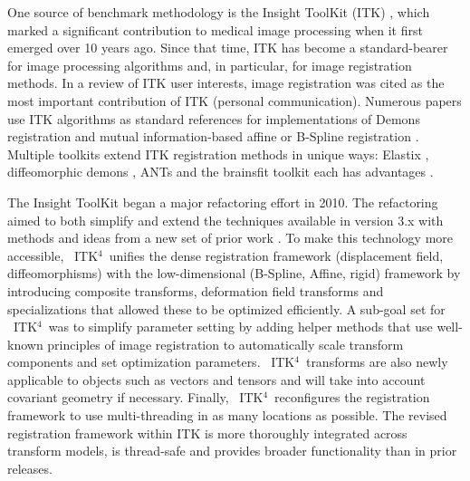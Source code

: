 \documentclass{llncs}
\newcommand{\tk}{~ITK$^{\text{4}}$~}
\begin{document}





One source of benchmark methodology is the Insight ToolKit (ITK)
\cite{Yoo2002,Ackerman2003}, which marked a significant contribution to
medical image processing when it first emerged over 10 years ago.
Since that time, ITK has become a standard-bearer for image
processing algorithms and, in particular, for image registration
methods.  In a review of ITK user interests, image registration was cited as the most important
contribution of ITK (personal communication).  Numerous papers use ITK
algorithms as standard references for implementations of Demons
registration and mutual information-based affine or B-Spline
registration \cite{2004,Shelton2005,Wolf2005,Floca2007,Chen2008,Cheung2009,Taka2011}.
Multiple toolkits extend ITK registration methods in unique ways:
Elastix \cite{Klein2010}, diffeomorphic demons \cite{Vercauteren2009},
ANTs \cite{Avants2011} and the brainsfit toolkit \cite{Kikinis2011} each has advantages
\cite{Klein2010,Murphy2011}.  


The Insight ToolKit began a major refactoring effort in 2010.
The refactoring aimed to both simplify and extend the techniques available in version
3.x with methods and ideas from a new set of prior work
\cite{Jenkinson2001,Christensen1996,Rueckert1999,Miller2005,Peyrat2010,Avants2011}.
To make this technology more accessible, \tk unifies the dense
registration framework (displacement field, diffeomorphisms)
with the low-dimensional (B-Spline, Affine, rigid) framework by
introducing composite transforms, deformation field transforms and
specializations that allowed these to be optimized efficiently.  A sub-goal set for \tk was to simplify
parameter setting by adding helper methods that use well-known
principles of image registration to automatically scale transform
components and set optimization parameters.  \tk transforms are also
newly applicable to objects such as vectors and tensors and will take into account covariant geometry if
necessary.  Finally, \tk reconfigures the registration framework
to use multi-threading in as many locations as possible.
The revised registration framework within ITK is more thoroughly
integrated across transform models, is thread-safe and provides
broader functionality than in prior releases. 
\end{document}
